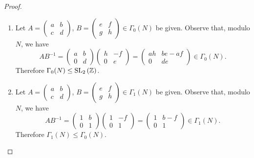 \documentclass[10pt]{amsart}
\begin{document}
\begin{thm}
  \begin{proof}
	\begin{enumerate}
		\item
			Let $A = \left(
					\begin{array}{cc}
						a & b\\
						c & d
					\end{array}
				 \right)$,
				$B = \left(
					\begin{array}{cc}
						e & f\\
						g & h
					\end{array}
				 \right) \in \Gamma_0(N)$ be given.
				 Observe that, modulo $N$, we have
					$$AB^{-1} = 
					\left(
					\begin{array}{cc}
						a & b\\
						0 & d
					\end{array}
					\right)
					\left(
					\begin{array}{cc}
						h & -f\\
						0 & e
					\end{array}
					\right)
					=
					\left(
					\begin{array}{cc}
						ah & be - af\\
						0 & de
					\end{array}
				 \right) \in \Gamma_0(N).$$
			Therefore $\Gamma_0(N) \leq \operatorname{SL}_2\left(\mathbb{Z}\right)$.
		\item
			Let $A = \left(
					\begin{array}{cc}
						a & b\\
						c & d
					\end{array}
				 \right)$,
				$B = \left(
					\begin{array}{cc}
						e & f\\
						g & h
					\end{array}
				 \right) \in \Gamma_1(N)$ be given.
				 Observe that, modulo $N$, we have
					$$AB^{-1} = 
					\left(
					\begin{array}{cc}
						1 & b\\
						0 & 1
					\end{array}
					\right)
					\left(
					\begin{array}{cc}
						1 & -f\\
						0 & 1
					\end{array}
					\right)
					=
					\left(
					\begin{array}{cc}
						1 & b - f\\
						0 & 1
					\end{array}
				 \right) \in \Gamma_1(N).$$
			Therefore $\Gamma_1(N) \leq \Gamma_0(N)$.
			

\end{enumerate}
\end{proof}
\end{thm}
\end{document}
